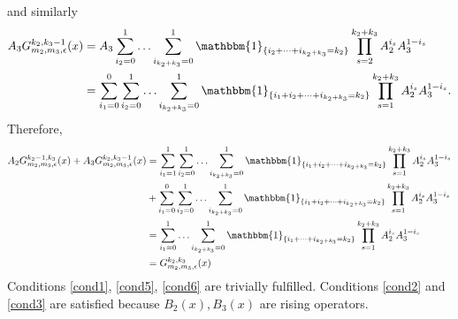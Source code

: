 \documentclass[11pt]{article}
\numberwithin{equation}{section}
\numberwithin{equation}{subsection}
\begin{document}
and similarly 
\begin{equation}
	\begin{split}
		A_{3}G_{m_{2},m_{3},\epsilon}^{k_{2},k_{3}-1}(x)&=A_{3}\sum_{i_{2}=0}^{1}\ldots\sum_{i_{k_{2}+k_{3}}=0}^{1}\mathbbm{1}_{\{i_{2}+\cdots+i_{k_{2}+k_{3}}=k_{2}\}}\prod_{s=2}^{k_{2}+k_{3}}A_{2}^{i_{s}}A_{3}^{1-i_{s}}
		\\&=
		\sum_{i_{1}=0}^{0}\sum_{i_{2}=0}^{1}\ldots\sum_{i_{k_{2}+k_{3}}=0}^{1}\mathbbm{1}_{\{i_{1}+i_{2}+\cdots+i_{k_{2}+k_{3}}=k_{2}\}}\prod_{s=1}^{k_{2}+k_{3}}A_{2}^{i_{s}}A_{3}^{1-i_{s}}.
	\end{split}
\end{equation}
Therefore,
\begin{equation}
	\begin{split}
A_{2}G_{m_{2},m_{3},\epsilon}^{k_{2}-1,k_{3}}(x)+A_{3}G_{m_{2},m_{3},\epsilon}^{k_{2},k_{3}-1}(x)&=\sum_{i_{1}=1}^{1}\sum_{i_{2}=0}^{1}\ldots\sum_{i_{k_{2}+k_{3}}=0}^{1}\mathbbm{1}_{\{i_{1}+i_{2}+\cdots+i_{k_{2}+k_{3}}=k_{2}\}}\prod_{s=1}^{k_{2}+k_{3}}A_{2}^{i_{s}}A_{3}^{1-i_{s}}
\\&+
	\sum_{i_{1}=0}^{0}\sum_{i_{2}=0}^{1}\ldots\sum_{i_{k_{2}+k_{3}}=0}^{1}\mathbbm{1}_{\{i_{1}+i_{2}+\cdots+i_{k_{2}+k_{3}}=k_{2}\}}\prod_{s=1}^{k_{2}+k_{3}}A_{2}^{i_{s}}A_{3}^{1-i_{s}}
	\\&=
	\sum_{i_{1}=0}^{1}\ldots\sum_{i_{k_{2}+k_{3}}=0}^{1}\mathbbm{1}_{\{i_{1}+\cdots+i_{k_{2}+k_{3}}=k_{2}\}}\prod_{s=1}^{k_{2}+k_{3}}A_{2}^{i_{s}}A_{3}^{1-i_{s}}
	\\&=
		G_{m_{2},m_{3},\epsilon}^{k_{2},k_{3}}(x)
	\end{split}
\end{equation}
Conditions \eqref{cond1}, \eqref{cond5}, \eqref{cond6} are trivially fulfilled. Conditions \eqref{cond2} and \eqref{cond3} are satisfied because $B_{2}(x),B_{3}(x)$ are rising operators.
\end{document}
